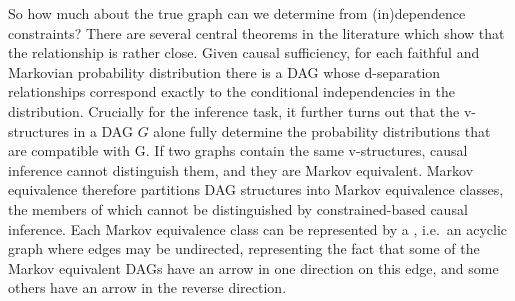 So how much about the true graph can we determine from (in)dependence constraints? There are several central theorems in the literature which show that the relationship is rather close. Given causal sufficiency, for each faithful and Markovian probability distribution there is a DAG whose d-separation relationships correspond exactly to the conditional independencies in the distribution. Crucially for the inference task, it further turns out that the v-structures in a DAG $G$ alone fully determine the probability distributions that are compatible with G. If two graphs contain the same v-structures, causal inference cannot distinguish them, and they are Markov equivalent. Markov equivalence therefore partitions DAG structures into Markov equivalence classes, the members of which cannot be distinguished by constrained-based causal inference. Each Markov equivalence class can be represented by a \textit{}, i.e.\ an acyclic graph where edges may be undirected, representing the fact that some of the Markov equivalent DAGs have an arrow in one direction on this edge, and some others have an arrow in the reverse direction.

